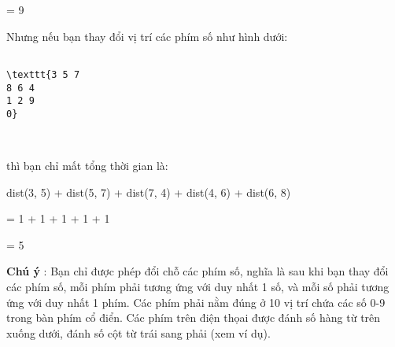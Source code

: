 = 9

Nhưng nếu bạn thay đổi vị trí các phím số như hình dưới:
\begin{verbatim}

\texttt{3 5 7
8 6 4
1 2 9
0}\end{verbatim}

 

thì bạn chỉ mất tổng thời gian là:

dist(3, 5) + dist(5, 7) + dist(7, 4) + dist(4, 6) + dist(6, 8)

= 1 + 1 + 1 + 1 + 1

= 5

\textbf{Chú ý } : Bạn chỉ được phép đổi chỗ các phím số, nghĩa là sau khi bạn thay đổi các phím số, mỗi phím phải tương ứng với duy nhất 1 số, và mỗi số phải tương ứng với duy nhất 1 phím. Các phím phải nằm đúng ở 10 vị trí chứa các số 0-9 trong bàn phím cổ điển. Các phím trên điện thọai được đánh số hàng từ trên xuống dưới, đánh số cột từ trái sang phải (xem ví dụ).